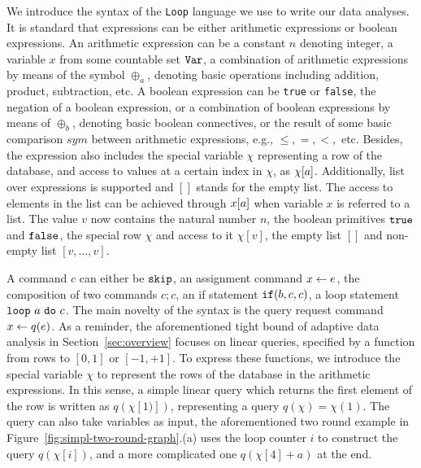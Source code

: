 %
We introduce the syntax of the {\tt Loop} language we use to write our data analyses.
It is standard that expressions can be either arithmetic expressions or boolean expressions.
An arithmetic expression can be a  constant $n$ denoting integer, a variable $x$ from some countable set $\tt Var$, a combination of arithmetic expressions by means of the symbol $\oplus_a$, denoting basic operations including addition, product, subtraction, etc.
%
A boolean expression can be {\tt true} or {\tt false}, the negation of
a boolean expression, or a combination of boolean expressions by means of $\oplus_b$, denoting basic boolean connectives, or the result of some basic comparison $sym$ between arithmetic expressions, e.g., $\leq,=,<,$ etc. 
Besides, the expression also includes the special variable $\chi$ representing a row of the database, and access to values at a certain index in $\chi$, as $\chi[a]$. Additionally, list over expressions is supported and $[]$ stands for the empty list. The access to elements in the list can be achieved through $x[a]$ when variable $x$ is referred to a list. The value $v$ now contains the natural number $n$, the boolean primitives $\mathtt{true}$ and $\mathtt{false}$, the special row $\chi$ and access to it $\chi[v]$, the empty list $[]$ and non-empty list $[v, \dots, v]$.
% 
%

  A command $c$ can either be $\mathtt{skip}$, an assignment command $\mathrel{ x \leftarrow e }$, the composition of two commands $c;c$, an if statement $\mathtt{if}(b, c, c)$, a loop statement  $\mathtt{loop} ~ a ~ \mathtt{do} ~ c $.
 The main novelty of the syntax is the query request command $\mathrel{ x \leftarrow q(e) }$. As a reminder, the aforementioned tight bound of adaptive data analysis in Section~\ref{sec:overview} focuses on linear queries, specified by a function from rows to $[0,1]$ or $[-1,+1]$. To express these functions, we introduce the special variable $\chi$ to represent the rows of the database in the arithmetic expressions. In this sense, a simple linear query which returns the first element of the row is written as $q(\chi[1)])$, representing a query $q(\chi) = \chi(1)$. The query can also take variables as input, the aforementioned two round example in Figure~\ref{fig:simpl-two-round-graph}.(a) uses the loop counter $i$ to construct the query $q(\chi[i])$, and a more complicated one $q(\chi[4]+a)$ at the end.  
 
 



